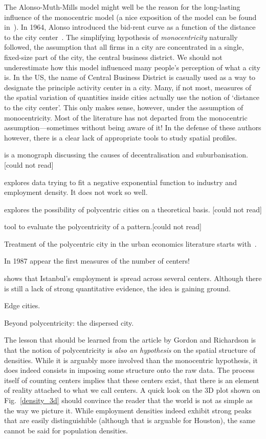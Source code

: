 The Alonso-Muth-Mills model might well be the reason for the long-lasting influence of
the monocentric model (a nice exposition of the model can be found
in~\cite{Fujita:1989}). In 1964, Alonso introduced the bid-rent curve as a
function of the distance to the city center~\cite{Alonso:1964}. The simplifying hypothesis of
\emph{monocentricity} naturally followed, the assumption that all firms in a
city are concentrated in a single, fixed-size part of the city, the central business
district. We should not underestimate how this model influenced many people's
perception of what a city is. In the US, the name of Central Business District
is casually used as a way to designate the principle activity center in a city.
Many, if not most, measures of the spatial variation of quantities inside cities
actually use the notion of `distance to the city center'. This only makes sense,
however, under the assumption of monocentricity. Most of the
literature has not departed from the monocentric assumption---sometimes without
being aware of it! In the defense of these authors however, there is a clear
lack of appropriate tools to study spatial profiles.


\cite{Mills:1972} is a monograph discussing the causes of decentralisation and
suburbanisation. [could not read]

\cite{Kemper:1974} explores data trying to fit a negative exponential function
to industry and employment density. It does not work so well.

\cite{Odland:1978} explores the possibility of polycentric cities on a
theoretical basis. [could not read]

\cite{Griffith:1981} tool to evaluate the polycentricity of a pattern.[could not
read]

Treatment of the polycentric city in the urban economics literature starts
with~\cite{Fujita:1982}.

In 1987 appear the first measures of the number of centers!


\cite{Dokmeci:1994} shows that Istanbul's employment is spread across several
centers. Although there is still a lack of strong quantitative evidence, the
idea is gaining ground.

\cite{Garreau:1991} Edge cities.

\cite{Gordon:1996} Beyond polycentricity: the dispersed city.

The lesson that should be learned from the article by Gordon and Richardson is
that the notion of polycentricity is \emph{also an hypothesis} on the spatial
structure of densities. While it is arguably more involved than the monocentric
hypothesis, it does indeed consists in imposing some structure onto the raw
data. The process itself of counting centers implies that these centers exist,
that there is an element of reality attached to what we call centers. A quick
look on the 3D plot shown on Fig.~\ref{density_3d} should convince the reader
that the world is not as simple as the way we picture it. While employment
densities indeed exhibit strong peaks that are easily distinguishible (although
that is arguable for Houston), the same cannot be said for population densities.

